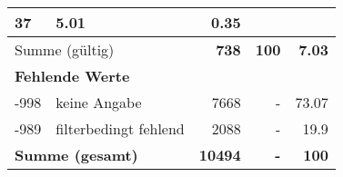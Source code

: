 \begin{longtable}{lXrrr}
       \num{37} &
       \num[round-mode=places,round-precision=2]{5,01} &
         \num[round-mode=places,round-precision=2]{0,35} \\
     \midrule
     \multicolumn{2}{l}{Summe (gültig)} &
       \textbf{\num{738}} &
     \textbf{100} &
       \textbf{\num[round-mode=places,round-precision=2]{7,03}} \\
     \multicolumn{5}{l}{\textbf{Fehlende Werte}}\\
       -998 &
       keine Angabe &
         \num{7668} &
        - &
         \num[round-mode=places,round-precision=2]{73,07} \\
       -989 &
       filterbedingt fehlend &
         \num{2088} &
        - &
         \num[round-mode=places,round-precision=2]{19,9} \\
     \midrule
     \multicolumn{2}{l}{\textbf{Summe (gesamt)}} &
          \textbf{\num{10494}} &
        \textbf{-} &
        \textbf{100} \\
     \bottomrule
     \end{longtable}
     
